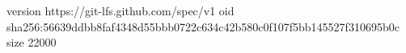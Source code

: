 version https://git-lfs.github.com/spec/v1
oid sha256:56639ddbb8faf4348d55bbb0722c634c42b580c0f107f5bb145527f310695b0c
size 22000
